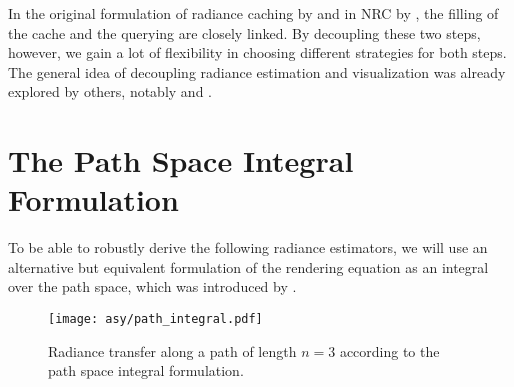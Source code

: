 In the original formulation of radiance caching by \textcite{ward1988} and in NRC by \textcite{muller2021}, the filling of the cache and the querying are closely linked.
By decoupling these two steps, however, we gain a lot of flexibility in choosing different strategies for both steps.
The general idea of decoupling radiance estimation and visualization was already explored by others, notably \textcite{walter1999} and \textcite{tole2002}.

\section{The Path Space Integral Formulation}
\label{sec:path_space_integral}
To be able to robustly derive the following radiance estimators, we will use an alternative but equivalent formulation of the rendering equation as an integral over the path space, which was introduced by \textcite{veach1997}.
\begin{figure}[htb!]
    \centering
    \texttt{[image: asy/path\_integral.pdf]}
\caption{Radiance transfer along a path of length $n=3$ according to the path space integral formulation.}
\label{fig:path_space_integral}
\end{figure}

